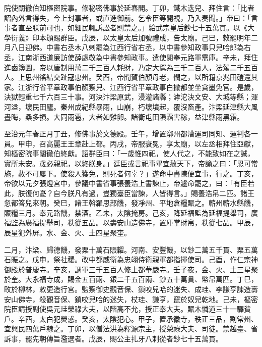 \begin{pinyinscope}
院使闊徹伯知樞密院事。修秘密佛事於延春閣。丁卯，鐵木迭兒、拜住言：「比者詔內外言得失，今上封事者，或直進御前。乞令臣等開視，乃入奏聞。」帝曰：「言事者直至朕前可也，如細民輒訴訟者則禁之。」給武宗皇后鈔七十五萬貫。以《大學衍義》印本頒賜群臣。戊辰，以太皇太后加號禮成，告太廟。己巳，敕罷明年二月八日迎佛。中書右丞木八剌罷為江西行省右丞，以中書參知政事只兒哈郎為右丞，江南浙西道廉訪使薛處敬為中書參知政事。遣使閱奉元路軍需庫。辛未，拜住進鹵簿圖，帝以唐制用萬二千三百人耗財，乃定大駕為三千二百人，法駕二千五百人。上思州徭結交趾寇忠州。癸酉，帝聞賀伯顏母老，憫之，以所籍京兆田磑還其家。江浙行省平章政事伯顏察兒、江西行省平章政事白撒都並坐貪墨免官。是歲，決獄輕重七千六百三十事。河決汴梁原武，浸灌諸縣；滹沱決文安、大城等縣；渾河溢，壞民田廬。秦州成紀縣暴雨，山崩，朽壞墳起，覆沒畜產。汴梁延津縣大風晝晦，桑多損。大同雨雹，大者如雞卵。諸衛屯田隕霜害稼，益津縣雨黑霜。



 至治元年春正月丁丑，修佛事於文德殿。壬午，增置漷州都漕運司同知、運判各一員。甲申，召高麗王王章赴上都。丙戌，帝服袞冕，享太廟，以左丞相拜住亞獻，知樞密院事闊徹伯終獻。詔群臣曰：「一歲惟四祀，使人代之，不能致如在之誠，實所未安。歲必親祀，以終朕身。」廷臣或言祀事畢宜赦天下，帝諭之曰：「恩可常施，赦不可屢下。使殺人獲免，則死者何辜？」遂命中書陳便宜事，行之。丁亥，帝欲以元夕張燈宮中，參議中書省事張養浩上書諫止，帝遽命罷之，曰：「有臣若此，朕復何憂？自今朕凡有過，豈獨臺臣當諫，人皆得言。」賜養浩帛二匹。諸王忽都答兒來朝。癸巳，諸王斡羅思部饑，發凈州、平地倉糧賑之。蘄州蘄水縣饑，賑糧三月。奉元路饑，禁酒。乙未，太陰掩房。己亥，降延福監為延福提舉司，廣福監為廣福提舉司，秩從五品。以壽安山造佛寺，置庫掌財帛，秩從七品。甲辰，辰星犯外屏。水、金、火、土四星聚奎。



 二月，汴梁、歸德饑，發粟十萬石賑糶。河南、安豐饑，以鈔二萬五千貫、粟五萬石賑之。戊申，祭社稷。改中都威衛為忠翊侍衛親軍都指揮使司。己酉，作仁宗神御殿於普慶寺。辛亥，調軍三千五百人修上都華嚴寺。壬子夜，金、火、土三星聚於奎。大永福寺成，賜金五百兩、銀二千五百兩、鈔五十萬貫、幣帛萬匹。丁巳，畋於柳林，敕更造行宮。監察御史觀音保、鎖咬兒哈的迷失、成珪、李謙亨諫造壽安山佛寺，殺觀音保、鎖咬兒哈的迷失，杖珪、謙亨，竄於奴兒乾地。己未，樞密院臣請授副使吳元珪榮祿大夫，以階高不允，授正奉大夫。賑木憐道三十一驛貧戶。辛酉，太白犯熒惑。癸亥，太陰犯心。甲子，置承徽寺，秩正三品，割常州、宜興民四萬戶隸之。丁卯，以僧法洪為釋源宗主，授榮祿大夫、司徒。禁越臺、省訴事，罷先朝傳旨濫選者。戊辰，賜公主扎牙八剌從者鈔七十五萬貫。




\end{pinyinscope}
